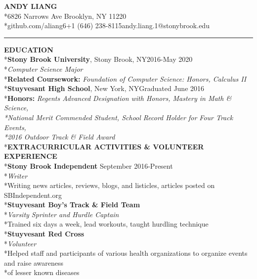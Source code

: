 \documentclass[11pt]{letter}
\begin{document}
\begin{center}
\LARGE\textbf{ANDY LIANG}
\bigskip
\normalsize\\*6826 Narrows Ave Brooklyn, NY 11220
\smallskip
\\*github.com/aliang6\hspace{0.25cm}\textbar\hspace{0.25cm}+1 (646) 238-8115\hspace{0.25cm}\textbar\hspace{0.25cm}andy.liang.1@stonybrook.edu
\rule{\textwidth}{1pt}
\end{center}

\begin{flushleft}
\vspace{-4mm}\large\textbf{EDUCATION}
\\*\normalsize\textbf{Stony Brook University}, Stony Brook, NY\hfill2016-May 2020
\\*\textit{Computer Science Major}
\\*\textbf{Related Coursework: }\textit{Foundation of Computer Science: Honors, Calculus II}
\medskip
\\*\textbf{Stuyvesant High School}, New York, NY\hfill Graduated June 2016
\\*\textbf{Honors: }\textit{Regents Advanced Designation with Honors, Mastery in Math \& Science,\\*National Merit Commended Student, School Record Holder for Four Track Events,\\*2016 Outdoor Track \& Field Award}
\vspace{7.5mm}
\\*\textbf{EXTRACURRICULAR ACTIVITIES \& VOLUNTEER EXPERIENCE}
\\*\textbf{Stony Brook Independent} \hfill September 2016-Present
\\*\textit{Writer}
\\*\qquad Writing news articles, reviews, blogs, and listicles, articles posted on SBIndependent.org
\\*\textbf{Stuyvesant Boy's Track \& Field Team}
\\*\textit{Varsity Sprinter and Hurdle Captain}
\\*\qquad Trained six days a week, lead workouts, taught hurdling technique
\\*\textbf{Stuyvesant Red Cross}
\\*\textit{Volunteer}
\\*\qquad Helped staff and participants of various health organizations to organize events and raise awareness \\*\qquad of lesser known diseases

\end{flushleft}
\end{document}
